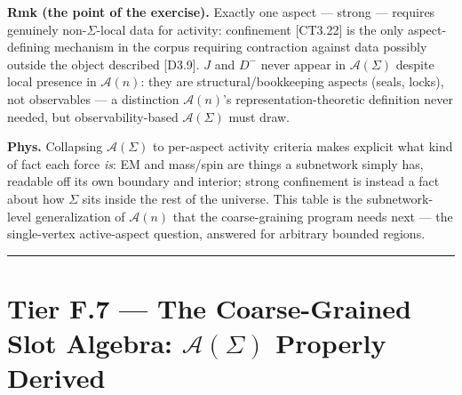\begin{theorem}
\textbf{Rmk (the point of the exercise).} Exactly one aspect — strong — requires genuinely non-$\Sigma$-local data for activity: confinement [CT3.22] is the only aspect-defining mechanism in the corpus requiring contraction against data possibly outside the object described [D3.9]. $J$ and $D^-$ never appear in $\mathcal A(\Sigma)$ despite local presence in $\mathcal A(n)$: they are structural/bookkeeping aspects (seals, locks), not observables — a distinction $\mathcal A(n)$'s representation-theoretic definition never needed, but observability-based $\mathcal A(\Sigma)$ must draw.

\textbf{Phys.} Collapsing $\mathcal A(\Sigma)$ to per-aspect activity criteria makes explicit what kind of fact each force \textit{is}: EM and mass/spin are things a subnetwork simply has, readable off its own boundary and interior; strong confinement is instead a fact about how $\Sigma$ sits inside the rest of the universe. This table is the subnetwork-level generalization of $\mathcal A(n)$ that the coarse-graining program needs next — the single-vertex active-aspect question, answered for arbitrary bounded regions.

\vspace{2pt}\noindent\rule{\textwidth}{0.4pt}\vspace{2pt}

\end{theorem}

\section[Tier F.7 — The Coarse-Grained Slot Algebra: $\mathcal A(\Sigma)$ Properly Derived]{\texorpdfstring{Tier F.7 — The Coarse-Grained Slot Algebra: $\mathcal A(\Sigma)$ Properly Derived}{Tier F.7 - The Coarse-Grained Slot Algebra: Properly Derived}}

